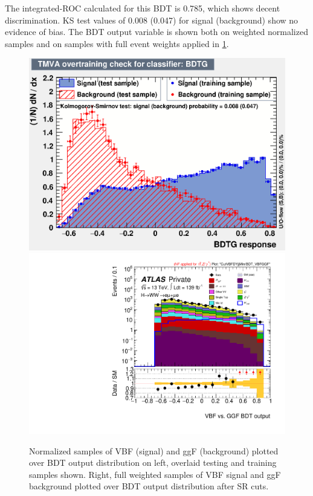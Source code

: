 The integrated-ROC calculated for this BDT is 0.785, which shows decent discrimination. KS test values of 0.008 (0.047) for signal (background) show no evidence of bias. The BDT output variable is shown both on weighted normalized samples and on samples with full event weights applied in \ref{fig:ggFVBFBDTresult}. 

\begin{figure}[!htbp]
\centering
  \includegraphics[width=.4\linewidth]{Pictures/ggFVBF/overtrain_BDTG.eps}
  \includegraphics[width=.45\linewidth]{Pictures/run2-emme-CutVBFDYjjMin-BDT_VBFGGF-log.pdf}
\caption{Normalized samples of VBF (signal) and ggF (background) plotted over BDT output distribution on left, overlaid testing and training samples shown. Right, full weighted samples of VBF signal and ggF background plotted over BDT output distribution after SR cuts.}
\label{fig:ggFVBFBDTresult}
\end{figure}

%


